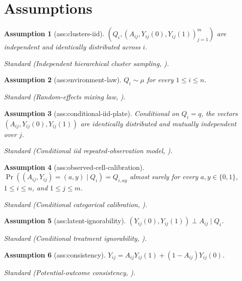 \documentclass{article}
\newtheorem{assumption}{Assumption}
\begin{document}
\section{Assumptions}

\begin{assumption}[ass:clusters-iid]\label{ass:clusters-iid}
\((Q_i,(A_{ij},Y_{ij}(0),Y_{ij}(1))_{j=1}^m)\) are independent and identically distributed across \(i\).
\par\smallskip\noindent\emph{Standard} (Independent hierarchical cluster sampling, \cite{NobreSchmidtMoodieStephens2023}).
\end{assumption}

\begin{assumption}[ass:environment-law]\label{ass:environment-law}
\(Q_i\sim\mu\) for every \(1\le i\le n\).
\par\smallskip\noindent\emph{Standard} (Random-effects mixing law, \cite{NobreSchmidtMoodieStephens2023}).
\end{assumption}

\begin{assumption}[ass:conditional-iid-plate]\label{ass:conditional-iid-plate}
Conditional on \(Q_i=q\), the vectors \((A_{ij},Y_{ij}(0),Y_{ij}(1))\) are identically distributed and mutually independent over \(j\).
\par\smallskip\noindent\emph{Standard} (Conditional iid repeated-observation model, \cite{LeeWeidner2026}).
\end{assumption}

\begin{assumption}[ass:observed-cell-calibration]\label{ass:observed-cell-calibration}
\(\Pr((A_{ij},Y_{ij})=(a,y)\mid Q_i)=Q_{i,ay}\) almost surely for every \(a,y\in\{0,1\}\), \(1\le i\le n\), and \(1\le j\le m\).
\par\smallskip\noindent\emph{Standard} (Conditional categorical calibration, \cite{NobreSchmidtMoodieStephens2023}).
\end{assumption}

\begin{assumption}[ass:latent-ignorability]\label{ass:latent-ignorability}
\((Y_{ij}(0),Y_{ij}(1))\perp A_{ij}\mid Q_i\).
\par\smallskip\noindent\emph{Standard} (Conditional treatment ignorability, \cite{RosenbaumRubin1983}).
\end{assumption}

\begin{assumption}[ass:consistency]\label{ass:consistency}
\(Y_{ij}=A_{ij}Y_{ij}(1)+(1-A_{ij})Y_{ij}(0)\).
\par\smallskip\noindent\emph{Standard} (Potential-outcome consistency, \cite{Rubin1974}).
\end{assumption}
\end{document}
